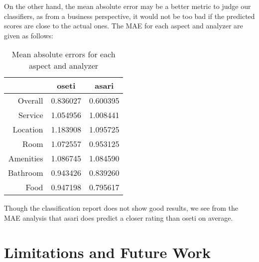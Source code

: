 \documentclass[12pt]{article}
\begin{document}
	On the other hand, the mean absolute error may be a better metric to judge our classifiers, as from a business perspective, it would not be too bad if the predicted scores are close to the actual ones. The MAE for each aspect and analyzer are given as follows: 
	
	\begin{table}[h]
		\begin{center}
			{\renewcommand{\arraystretch}{1.5}
			\renewcommand{\tabcolsep}{0.2cm}
			\begin{tabular}{|r|c|c|}
				\hline
				& oseti & asari\\
				\hline
				Overall & 0.836027 & 0.600395\\
				\hline
				Service & 1.054956 & 1.008441\\
				\hline
				Location & 1.183908 & 1.095725\\
				\hline
				Room & 1.072557 & 0.953125\\
				\hline
				Amenities & 1.086745 & 1.084590\\
				\hline
				Bathroom & 0.943426 & 0.839260\\
				\hline
				Food & 0.947198 & 0.795617\\
				\hline
			\end{tabular}}
		\end{center}
		\caption{Mean absolute errors for each aspect and analyzer}
	\end{table}
	
	Though the classification report does not show good results, we see from the MAE analysis that asari does predict a closer rating than oseti on average.
	
	\section{Limitations and Future Work}
	
\end{document}
